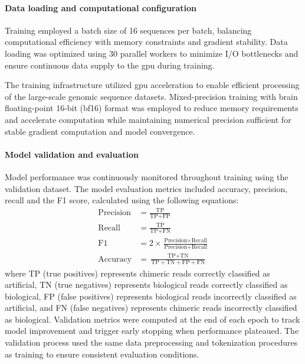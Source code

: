 \documentclass[pdflatex,sn-nature]{sn-jnl}%
\theoremstyle{thmstyleone}%
\theoremstyle{thmstyletwo}%
\theoremstyle{thmstylethree}%
\begin{document}
\paragraph{Data loading and computational configuration}
Training employed a batch size of 16 sequences per batch, balancing computational efficiency with memory constraints and gradient stability.
Data loading was optimized using 30 parallel workers to minimize I/O bottlenecks and ensure continuous data supply to the \gls{gpu} during training.

The training infrastructure utilized \gls{gpu} acceleration to enable efficient processing of the large-scale genomic sequence datasets.
Mixed-precision training with brain floating-point 16-bit (bf16) format was employed to reduce memory requirements and accelerate computation while maintaining numerical precision sufficient for stable gradient computation and model convergence.

\paragraph{Model validation and evaluation}
Model performance was continuously monitored throughout training using the validation dataset.
The model evaluation metrics included accuracy, precision, recall and the F1 score, calculated using the following equations:
\begin{align*}
	\textrm{Precision} & = \frac{\textrm{TP}}{\textrm{TP}+\textrm{FP}}                                                     \\
	\textrm{Recall}    & = \frac{\textrm{TP}}{\textrm{TP}+\textrm{FN}}                                                     \\
	\textrm{F1}        & = 2 \times \frac{\textrm{Precision} \times \textrm{Recall}}{\textrm{Precision} + \textrm{Recall}} \\
	\textrm{Accuracy}  & = \frac{\textrm{TP} + \textrm{TN}}{\textrm{TP} + \textrm{TN} + \textrm{FP} + \textrm{FN}}
\end{align*}
where TP (true positives) represents chimeric reads correctly classified as artificial, TN (true negatives) represents biological reads correctly classified as biological, FP (false positives) represents biological reads incorrectly classified as artificial, and FN (false negatives) represents chimeric reads incorrectly classified as biological.
Validation metrics were computed at the end of each epoch to track model improvement and trigger early stopping when performance plateaued.
The validation process used the same data preprocessing and tokenization procedures as training to ensure consistent evaluation conditions.
\end{document}
